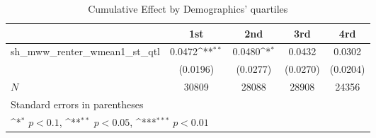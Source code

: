 \begin{table}[htbp]\centering
\def\sym#1{\ifmmode^{#1}\else\(^{#1}\)\fi}
\caption{Cumulative Effect by Demographics' quartiles}
\begin{tabular}{l*{4}{c}}
\hline\hline
            &\multicolumn{1}{c}{1st}&\multicolumn{1}{c}{2nd}&\multicolumn{1}{c}{3rd}&\multicolumn{1}{c}{4rd}\\
\hline
sh\_mww\_renter\_wmean1\_st\_qtl&      0.0472\sym{**} &      0.0480\sym{*}  &      0.0432         &      0.0302         \\
            &    (0.0196)         &    (0.0277)         &    (0.0270)         &    (0.0204)         \\
\hline
\(N\)       &       30809         &       28088         &       28908         &       24356         \\
\hline\hline
\multicolumn{5}{l}{\footnotesize Standard errors in parentheses}\\
\multicolumn{5}{l}{\footnotesize \sym{*} \(p<0.1\), \sym{**} \(p<0.05\), \sym{***} \(p<0.01\)}\\
\end{tabular}
\end{table}
